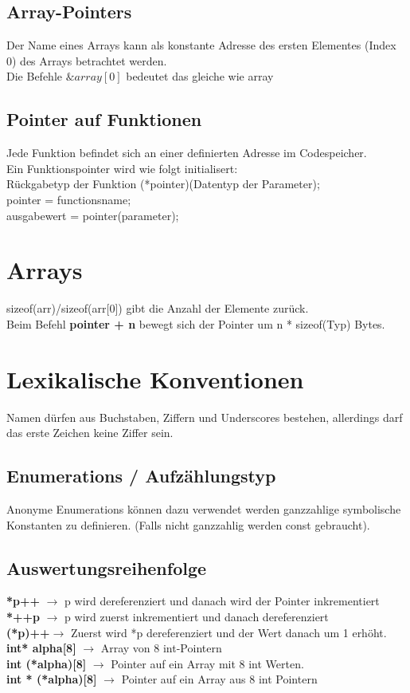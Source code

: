 \documentclass{article}
\begin{document}
\subsection{Array-Pointers}
Der Name eines Arrays kann als konstante Adresse des ersten Elementes (Index 0) des Arrays betrachtet werden. \\
Die Befehle $\&array[0]$ bedeutet das gleiche wie array
\subsection{Pointer auf Funktionen}
Jede Funktion befindet sich an einer definierten Adresse im Codespeicher. \\
Ein Funktionspointer wird wie folgt initialisert: \\
Rückgabetyp der Funktion (*pointer)(Datentyp der Parameter);\\
pointer = functionsname; \\
ausgabewert = pointer(parameter); \\

\section{Arrays}
sizeof(arr)/sizeof(arr[0]) gibt die Anzahl der Elemente zurück. \\

Beim Befehl \textbf{pointer + n} bewegt sich der Pointer um n * sizeof(Typ) Bytes. 
\section{Lexikalische Konventionen}
Namen dürfen aus Buchstaben, Ziffern und Underscores bestehen, allerdings darf das erste Zeichen keine Ziffer sein.
\subsection{Enumerations / Aufzählungstyp}
Anonyme Enumerations können dazu verwendet werden ganzzahlige symbolische Konstanten zu definieren. (Falls nicht ganzzahlig werden const gebraucht).
\subsection{Auswertungsreihenfolge}
\textbf{*p++} $\rightarrow$ p wird dereferenziert und danach wird der Pointer inkrementiert \\
\textbf{*++p} $\rightarrow$ p wird zuerst inkrementiert und danach dereferenziert\\
\textbf{(*p)++}$\rightarrow$ Zuerst wird *p dereferenziert und der Wert danach um 1 erhöht.\\
\textbf{int* alpha[8]} $\rightarrow$ Array von 8 int-Pointern \\
\textbf{int (*alpha)[8]} $\rightarrow$ Pointer auf ein Array mit 8 int Werten. \\
\textbf{int * (*alpha)[8]} $\rightarrow$ Pointer auf ein Array aus 8 int Pointern
\end{document}
